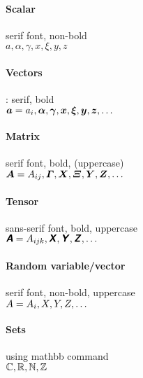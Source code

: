 \documentclass{article}
\begin{document}
	\paragraph{Scalar} serif font, non-bold \\
	$a, \alpha, \gamma, x, \xi, y, z $
	\paragraph{Vectors}: serif, bold \\
	$\bm{a} = a_i, \bm{\alpha}, \bm{\gamma},  \bm{x}, \bm{\xi}, \bm{y}, \bm{z}, \dots$
	
	\paragraph{Matrix} serif font, bold, (uppercase) \\
	$\bm{A} = A_{ij} , \bm{\varGamma},  \bm{X}, \bm{\varXi}, \bm{Y}, \bm{Z}, \dots$
		
	\paragraph{Tensor} sans-serif font, bold, uppercase \\
	$\textsf{\textbf{\textsl{A}}} = A_{ijk}, \textsf{\textbf{\textsl{X}}}, \textsf{\textbf{\textsl{Y}}}, \textsf{\textbf{\textsl{Z}}}, \dots $	
	
	\paragraph{Random variable/vector} serif font, non-bold, uppercase \\
	$A = A_{i}, X, Y, Z, \dots $			
	
	\paragraph{Sets} using mathbb command\\
	$ \mathbb{C}, \mathbb{R}, \mathbb{N}, \mathbb{Z} $	
	
\end{document}
